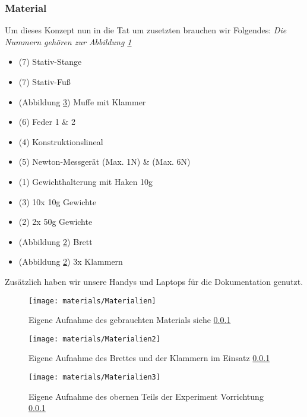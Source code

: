 \documentclass[../main.tex]{subfiles} %
\begin{document}
        \subsubsection{Material}\label{subsubsec:material}

            Um dieses Konzept nun in die Tat um zusetzten brauchen wir Folgendes:
            \textit{Die Nummern gehören zur Abbildung \ref{fig:material}}
            \begin{itemize}
                \item (7) Stativ-Stange
                \item (7) Stativ-Fuß
                \item (Abbildung \ref{fig:material3}) Muffe mit Klammer
                \item (6) Feder 1 \& 2
                \item (4) Konstruktionslineal
                \item (5) Newton-Messgerät (Max. 1N) \& (Max. 6N)
                \item (1) Gewichthalterung mit Haken 10g
                \item (3) 10x 10g Gewichte
                \item (2) 2x 50g Gewichte
                \item (Abbildung \ref{fig:material2}) Brett
                \item (Abbildung \ref{fig:material2}) 3x Klammern
            \end{itemize}
            \noindent
            Zusätzlich haben wir unsere Handys und Laptops für die Dokumentation genutzt.

            \begin{figure}[H]
                \centering
                \texttt{[image: materials/Materialien]}
                \caption{Eigene Aufnahme des gebrauchten Materials siehe \ref{subsubsec:material}}
                \label{fig:material}
            \end{figure}

            \begin{figure}[H]
                \centering
                \texttt{[image: materials/Materialien2]}
                \caption{Eigene Aufnahme des Brettes und der Klammern im Einsatz \ref{subsubsec:material}}
                \label{fig:material2}
            \end{figure}

            \begin{figure}[H]
                \centering
                \texttt{[image: materials/Materialien3]}
                \caption{Eigene Aufnahme des obernen Teils der Experiment Vorrichtung  \ref{subsubsec:material}}
                \label{fig:material3}
            \end{figure}
\end{document}
